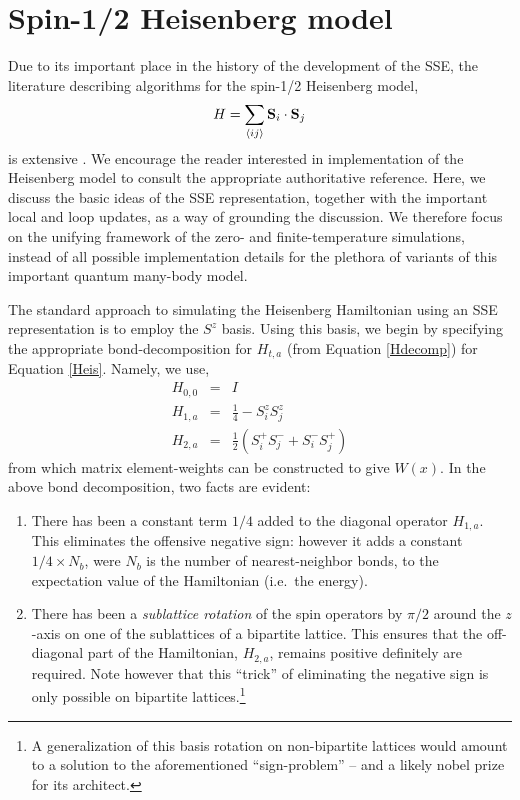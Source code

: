 \documentclass[vecphys]{svmult}
\begin{document}
\section{Spin-1/2 Heisenberg model} \label{Melko:HeisSec}

Due to its important place in the history of the development of the SSE, the literature describing algorithms for the spin-1/2 Heisenberg model,
\begin{equation}
H = \sum_{\langle i j \rangle} {\bf S}_i \cdot {\bf S}_j \label{Heis}
\end{equation}
is extensive \cite{Melko:Handscomb62, Melko:Henelius00, Melko:Sandvik91, Melko:Sandvik99,  Melko:SandvikHeis,Melko:Syljuasen02}.  We encourage the reader interested in implementation of the Heisenberg model to consult the appropriate authoritative reference. Here, we discuss the basic ideas of the SSE representation, together with the important local and loop updates, as a way of grounding the discussion.  We therefore focus on the unifying framework of the zero- and finite-temperature simulations, instead of all possible implementation details for the plethora of variants of this important quantum many-body model.

The  standard approach to simulating the Heisenberg Hamiltonian using an SSE representation is to employ the $S^z$ basis.  
Using this basis, we begin by specifying the appropriate bond-decomposition for $H_{t,a}$ (from Equation \ref{Hdecomp}) for Equation \ref{Heis}.
Namely, we use,
\begin{eqnarray}
H_{0,0} &=&I \\
H_{1,a} &=& \frac{1}{4} - S^z_i S^z_j \label{H1a} \label{diagB} \\
H_{2,a} &=& \frac{1}{2} (S^+_i S^-_j + S^-_i S^+_j) \label{odB}
\end{eqnarray}
from which matrix element-weights can be constructed to give $W(x)$.  In the above bond decomposition, two facts are evident:
\begin{enumerate}
\item There has been a constant term $1/4$ added to the diagonal operator $H_{1,a}$.  This eliminates the offensive negative sign: however it adds a constant $1/4 \times N_b$, were $N_b$ is the number of nearest-neighbor bonds, to the expectation value of the Hamiltonian (i.e.~the energy).
\item There has been a {\em sublattice rotation} of the spin operators by $\pi/2$ around the $z$-axis on one of the sublattices of a bipartite lattice.  This ensures that the off-diagonal part of the Hamiltonian, $H_{2,a}$, remains positive definitely are required.  Note however that this ``trick'' of eliminating the negative sign is only possible on bipartite lattices.\footnote{A generalization of this basis rotation on non-bipartite lattices would amount to a solution to the aforementioned ``sign-problem'' -- and a likely nobel prize for its architect.}
\end{enumerate}
\end{document}
